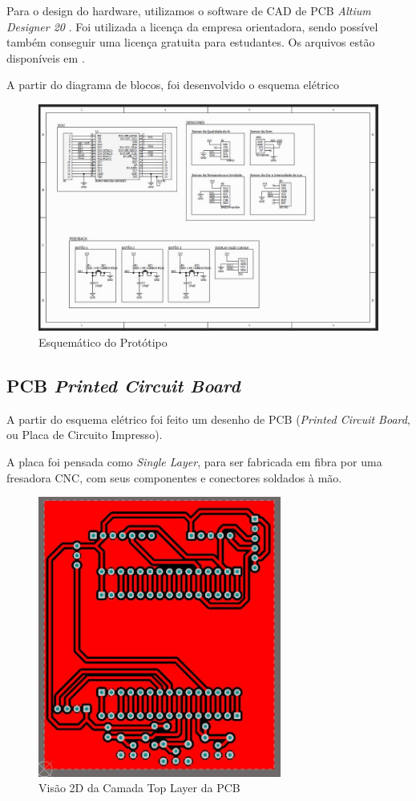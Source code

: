 \documentclass[../monografia.tex]{subfiles}
\begin{document}
Para o design do hardware, utilizamos o software de CAD de PCB \textit{Altium Designer 20} \cite{altium}. Foi utilizada a licença da empresa orientadora, sendo possível também conseguir uma licença gratuita para estudantes. Os arquivos estão disponíveis em \cite{git_hw}. 

A partir do diagrama de blocos, foi desenvolvido o esquema elétrico

\begin{figure}[h]
\includegraphics[width=\textwidth]{sch}
\caption{Esquemático do Protótipo}
\label{fig:img2}
\end{figure}

\subsection{PCB \textit{Printed Circuit Board}}

A partir do esquema elétrico foi feito um desenho de PCB (\textit{Printed Circuit Board}, ou Placa de Circuito Impresso). 

A placa foi pensada como \textit{Single Layer}, para ser fabricada em fibra por uma fresadora CNC, com seus componentes e conectores soldados à mão. 



\begin{figure}[h!]
\centering
\includegraphics[width=8cm]{pcb_2}
\caption{Visão 2D da Camada Top Layer da PCB}
\label{fig:img3}
\end{figure}
\end{document}
